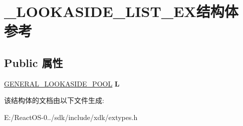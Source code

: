 \hypertarget{struct___l_o_o_k_a_s_i_d_e___l_i_s_t___e_x}{}\section{\+\_\+\+L\+O\+O\+K\+A\+S\+I\+D\+E\+\_\+\+L\+I\+S\+T\+\_\+\+E\+X结构体 参考}
\label{struct___l_o_o_k_a_s_i_d_e___l_i_s_t___e_x}
\subsection*{Public 属性}
\begin{DoxyCompactItemize}
\item 
\mbox{\label{struct___l_o_o_k_a_s_i_d_e___l_i_s_t___e_x_a461ebe8932cc2707099c184cb9424920}} 
\hyperlink{struct___g_e_n_e_r_a_l___l_o_o_k_a_s_i_d_e___p_o_o_l}{G\+E\+N\+E\+R\+A\+L\+\_\+\+L\+O\+O\+K\+A\+S\+I\+D\+E\+\_\+\+P\+O\+OL} {\bfseries L}
\end{DoxyCompactItemize}


该结构体的文档由以下文件生成\+:\begin{DoxyCompactItemize}
\item 
E\+:/\+React\+O\+S-\/0../sdk/include/xdk/extypes.\+h\end{DoxyCompactItemize}
